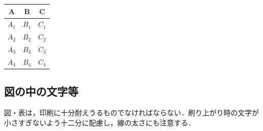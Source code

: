 \begin{multicols}{2}
\begin{center}
\label{fig:VFS}
\end{center}
\label{tab:cost2}
\begin{center}
\begin{tabular}{|c|c|c|} \hline
A & B & C \\ \hline
$A_{1}$ & $B_{1}$ & $C_{1}$ \\ \hline
$A_{2}$ & $B_{2}$ & $C_{2}$ \\ \hline
$A_{3}$ & $B_{3}$ & $C_{3}$ \\ \hline
$A_{4}$ & $B_{4}$ & $C_{4}$ \\ \hline
\end{tabular}
\end{center}

\subsection{図の中の文字等}
 図・表は，印刷に十分耐えうるものでなければならない．刷り上がり時の文字が小さすぎないよう十二分に配慮し，線の太さにも注意する．


\end{multicols}

